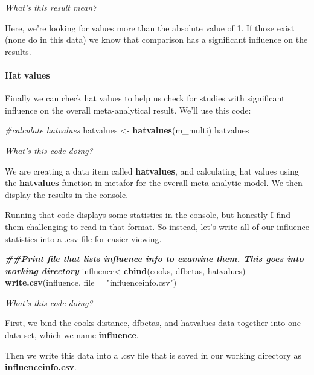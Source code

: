 \documentclass[
]{book}
\newenvironment{Shaded}{\begin{snugshade}}{\end{snugshade}}
\newcommand{\AttributeTok}[1]{\textcolor[rgb]{0.13,0.29,0.53}{#1}}
\newcommand{\CommentTok}[1]{\textcolor[rgb]{0.56,0.35,0.01}{\textit{#1}}}
\newcommand{\DocumentationTok}[1]{\textcolor[rgb]{0.56,0.35,0.01}{\textbf{\textit{#1}}}}
\newcommand{\FunctionTok}[1]{\textcolor[rgb]{0.13,0.29,0.53}{\textbf{#1}}}
\newcommand{\NormalTok}[1]{#1}
\newcommand{\OtherTok}[1]{\textcolor[rgb]{0.56,0.35,0.01}{#1}}
\newcommand{\StringTok}[1]{\textcolor[rgb]{0.31,0.60,0.02}{#1}}
\begin{document}
\emph{What's this result mean?}

Here, we're looking for values more than the absolute value of 1. If those exist (none do in this data) we know that comparison has a significant influence on the results.

\hypertarget{hat-values}{%
\paragraph{Hat values}\label{hat-values}}

Finally we can check hat values to help us check for studies with significant influence on the overall meta-analytical result. We'll use this code:

\begin{Shaded}
\begin{Highlighting}[]
\CommentTok{\#calculate hatvalues}
\NormalTok{hatvalues }\OtherTok{\textless{}{-}} \FunctionTok{hatvalues}\NormalTok{(m\_multi)}
\NormalTok{hatvalues}
\end{Highlighting}
\end{Shaded}

\emph{What's this code doing?}

We are creating a data item called \textbf{hatvalues}, and calculating hat values using the \textbf{hatvalues} function in metafor for the overall meta-analytic model. We then display the results in the console.

Running that code displays some statistics in the console, but honestly I find them challenging to read in that format. So instead, let's write all of our influence statistics into a .csv file for easier viewing.

\begin{Shaded}
\begin{Highlighting}[]
\DocumentationTok{\#\#Print file that lists influence info to examine them. This goes into working directory}
\NormalTok{influence}\OtherTok{\textless{}{-}}\FunctionTok{cbind}\NormalTok{(cooks, dfbetas, hatvalues)}
\FunctionTok{write.csv}\NormalTok{(influence, }\AttributeTok{file =} \StringTok{"influenceinfo.csv"}\NormalTok{)}
\end{Highlighting}
\end{Shaded}

\emph{What's this code doing?}

First, we bind the cooks distance, dfbetas, and hatvalues data together into one data set, which we name \textbf{influence}.

Then we write this data into a .csv file that is saved in our working directory as \textbf{influenceinfo.csv}.
\end{document}
